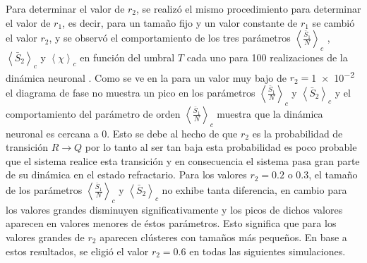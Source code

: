 Para determinar el valor de $r_2$, se realizó el mismo procedimiento para determinar el valor de $r_1$,  es decir, para un tamaño fijo y un valor constante de $r_1$ se cambió el valor $r_2$, y se observó  el comportamiento de los tres parámetros $\left\langle\frac{\bar{S}_1}{N}\right\rangle_c$ , $\left\langle\bar{S}_2\right\rangle_c$ y $\left\langle\chi\right\rangle_c$ en función del umbral $T$ cada uno para 100 realizaciones de la dinámica neuronal . Como se ve en la   para un valor muy bajo de $r_2=$\num{1e-2}  el diagrama de fase no muestra un pico en los parámetros  $\left\langle\frac{\bar{S}_1}{N}\right\rangle_c$ y $\left\langle\bar{S}_2\right\rangle_c$  y el comportamiento del parámetro de orden $\left\langle\frac{\bar{S}_1}{N}\right\rangle_c$ muestra que la dinámica neuronal es cercana a $0$. Esto se debe al hecho de que  $r_2$ es la probabilidad de transición $R\to Q$  por lo tanto al ser tan baja esta probabilidad es poco probable que el sistema realice esta transición y en consecuencia el sistema pasa gran parte de su dinámica  en el estado refractario. Para los valores $r_2 = 0.2$  o $0.3$, el tamaño de los parámetros $\left\langle\frac{\bar{S}_1}{N}\right\rangle_c$ y $\left\langle\bar{S}_2\right\rangle_c$ no exhibe tanta diferencia, en cambio para los valores grandes
disminuyen significativamente y los picos de dichos valores aparecen en valores menores de
éstos parámetros. Esto significa que para los valores grandes de $r_2$ aparecen clústeres con tamaños más pequeños. En base a estos resultados, se eligió el valor $r_2 = 0.6$  en todas las siguientes simulaciones.

